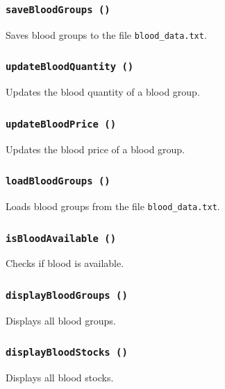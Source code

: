 \documentclass[12pt,a4paper]{report}
\begin{document}
\subsubsection{\texttt{saveBloodGroups ()}}
Saves blood groups to the file \texttt{blood\_data.txt}.


\subsubsection{\texttt{updateBloodQuantity ()}}
Updates the blood quantity of a blood group.


\subsubsection{\texttt{updateBloodPrice ()}}
Updates the blood price of a blood group.


\subsubsection{\texttt{loadBloodGroups ()}}
Loads blood groups from the file \texttt{blood\_data.txt}.


\subsubsection{\texttt{isBloodAvailable ()}}
Checks if blood is available.


\subsubsection{\texttt{displayBloodGroups ()}}
Displays all blood groups.


\subsubsection{\texttt{displayBloodStocks ()}}
Displays all blood stocks.

\end{document}

